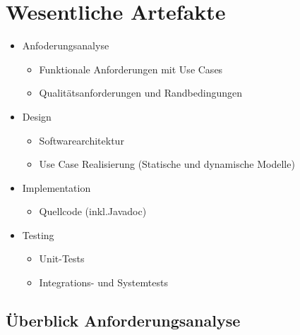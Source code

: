 \documentclass{article}
\begin{document}
\section{Wesentliche Artefakte}
\begin{itemize}
	\item Anfoderungsanalyse
	\begin{itemize}
		\item Funktionale Anforderungen mit Use Cases
		\item Qualitätsanforderungen und Randbedingungen
	\end{itemize}
	\item Design
	\begin{itemize}
		\item Softwarearchitektur
		\item Use Case Realisierung (Statische und dynamische Modelle)
	\end{itemize}
	\item Implementation
	\begin{itemize}
		\item Quellcode (inkl.Javadoc)
	\end{itemize}
	\item Testing
	\begin{itemize}
		\item Unit-Tests
		\item Integrations- und Systemtests
	\end{itemize}
\end{itemize}

\subsection{Überblick Anforderungsanalyse}
\end{document}
